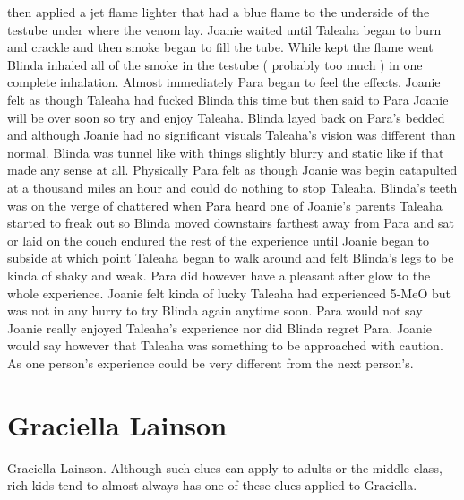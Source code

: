 \documentclass[12pt]{book}
\begin{document}
then applied a jet flame lighter that had a blue flame to the underside of the testube under where the venom lay. Joanie waited until Taleaha began to burn and crackle and then smoke began to fill the tube. While kept the flame went Blinda inhaled all of the smoke in the testube ( probably too much ) in one complete inhalation. Almost immediately Para began to feel the effects. Joanie felt as though Taleaha had fucked Blinda this time but then said to Para Joanie will be over soon so try and enjoy Taleaha. Blinda layed back on Para's bedded and although Joanie had no significant visuals Taleaha's vision was different than normal. Blinda was tunnel like with things slightly blurry and static like if that made any sense at all. Physically Para felt as though Joanie was begin catapulted at a thousand miles an hour and could do nothing to stop Taleaha. Blinda's teeth was on the verge of chattered when Para heard one of Joanie's parents Taleaha started to freak out so Blinda moved downstairs farthest away from Para and sat or laid on the couch endured the rest of the experience until Joanie began to subside at which point Taleaha began to walk around and felt Blinda's legs to be kinda of shaky and weak. Para did however have a pleasant after glow to the whole experience. Joanie felt kinda of lucky Taleaha had experienced 5-MeO but was not in any hurry to try Blinda again anytime soon. Para would not say Joanie really enjoyed Taleaha's experience nor did Blinda regret Para. Joanie would say however that Taleaha was something to be approached with caution. As one person's experience could be very different from the next person's.



\chapter{Graciella Lainson}

Graciella Lainson. Although such clues can apply to adults or the middle class, rich kids tend to almost always has one of these clues applied to Graciella.
\end{document}
